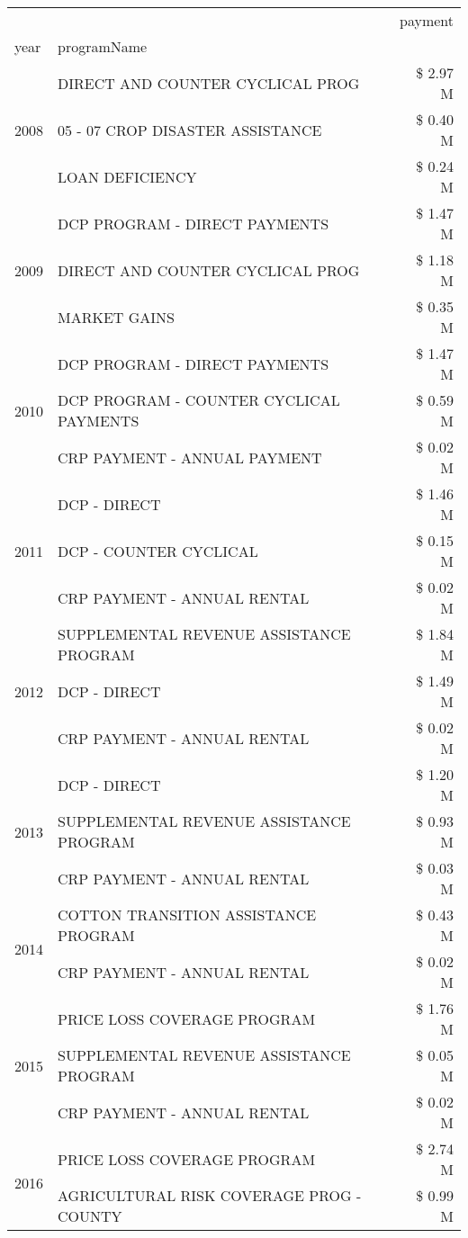 \begin{tabular}{llr}
\toprule
 &  & payment \\
year & programName &  \\
\midrule
\multirow[t]{3}{*}{2008} & DIRECT AND COUNTER CYCLICAL PROG & \$ 2.97 M \\
 & 05 - 07 CROP DISASTER ASSISTANCE & \$ 0.40 M \\
 & LOAN DEFICIENCY & \$ 0.24 M \\
\cline{1-3}
\multirow[t]{3}{*}{2009} & DCP PROGRAM - DIRECT PAYMENTS & \$ 1.47 M \\
 & DIRECT AND COUNTER CYCLICAL PROG & \$ 1.18 M \\
 & MARKET GAINS & \$ 0.35 M \\
\cline{1-3}
\multirow[t]{3}{*}{2010} & DCP PROGRAM - DIRECT PAYMENTS & \$ 1.47 M \\
 & DCP PROGRAM - COUNTER CYCLICAL PAYMENTS & \$ 0.59 M \\
 & CRP PAYMENT - ANNUAL PAYMENT & \$ 0.02 M \\
\cline{1-3}
\multirow[t]{3}{*}{2011} & DCP - DIRECT & \$ 1.46 M \\
 & DCP - COUNTER CYCLICAL & \$ 0.15 M \\
 & CRP PAYMENT - ANNUAL RENTAL & \$ 0.02 M \\
\cline{1-3}
\multirow[t]{3}{*}{2012} & SUPPLEMENTAL REVENUE ASSISTANCE PROGRAM & \$ 1.84 M \\
 & DCP - DIRECT & \$ 1.49 M \\
 & CRP PAYMENT - ANNUAL RENTAL & \$ 0.02 M \\
\cline{1-3}
\multirow[t]{3}{*}{2013} & DCP - DIRECT & \$ 1.20 M \\
 & SUPPLEMENTAL REVENUE ASSISTANCE PROGRAM & \$ 0.93 M \\
 & CRP PAYMENT - ANNUAL RENTAL & \$ 0.03 M \\
\cline{1-3}
\multirow[t]{2}{*}{2014} & COTTON TRANSITION ASSISTANCE PROGRAM & \$ 0.43 M \\
 & CRP PAYMENT - ANNUAL RENTAL & \$ 0.02 M \\
\cline{1-3}
\multirow[t]{3}{*}{2015} & PRICE LOSS COVERAGE PROGRAM & \$ 1.76 M \\
 & SUPPLEMENTAL REVENUE ASSISTANCE PROGRAM & \$ 0.05 M \\
 & CRP PAYMENT - ANNUAL RENTAL & \$ 0.02 M \\
\cline{1-3}
\multirow[t]{3}{*}{2016} & PRICE LOSS COVERAGE PROGRAM & \$ 2.74 M \\
 & AGRICULTURAL RISK COVERAGE PROG - COUNTY & \$ 0.99 M \\

\end{tabular}

